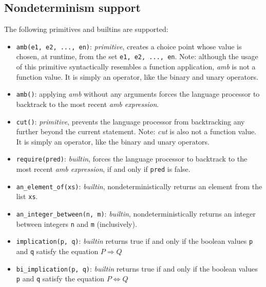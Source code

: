 \subsection*{Nondeterminism support}

The following primitives and builtins are supported:

\begin{itemize}
\item \lstinline{amb(e1, e2, ..., en)}: \textit{primitive}, creates a choice point whose value is chosen, at runtime,
from the set \lstinline{e1, e2, ..., en}. Note: although the usage of this primitive syntactically resembles a function application, \textit{amb} is not a function value. It is simply an operator, like the binary and unary operators.
\item \lstinline{amb()}: applying \textit{amb} without any arguments forces the language processor to backtrack to the most recent \textit{amb expression}.
\item \lstinline{cut()}: \textit{primitive}, prevents the language processor from backtracking any further beyond the current statement. Note: \textit{cut} is also not a function value. It is simply an operator, like the binary and unary operators.
\item \lstinline{require(pred)}: \textit{builtin}, forces the language processor to backtrack to the most recent \textit{amb expression}, if and only if \lstinline{pred} is false.
\item \lstinline{an_element_of(xs)}: \textit{builtin}, nondeterministically returns an element from the list \lstinline{xs}.
\item \lstinline{an_integer_between(n, m)}: \textit{builtin}, nondeterministically returns an integer between integers \lstinline{n} and \lstinline{m} (inclusively).
\item \lstinline{implication(p, q)}: \textit{builtin} returns true if and only if the boolean values \lstinline{p} and \lstinline{q} satisfy the equation $P \Rightarrow Q$
\item \lstinline{bi_implication(p, q)}: \textit{builtin} returns true if and only if the boolean values \lstinline{p} and \lstinline{q} satisfy the equation $P \Leftrightarrow Q$
\end{itemize}
